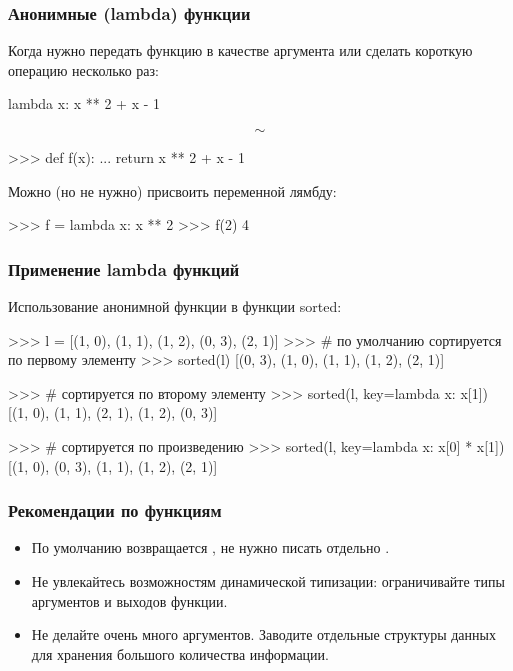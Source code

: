 \documentclass[fleqn, xcolor=x11names, 11pt]{beamer}
\begin{document}
\begin{frame}[fragile]\frametitle{Анонимные (lambda) функции}
Когда нужно передать функцию в качестве аргумента или сделать короткую операцию несколько раз:

\hfill

\begin{pcode}
lambda x: x ** 2 + x - 1
\end{pcode}
{\Large $$ \sim $$}
\begin{pcode}
>>> def f(x):
...     return x ** 2 + x - 1
\end{pcode} 

\hfill

Можно (но не нужно) присвоить переменной лямбду:
\begin{pcode}
>>>    f = lambda x: x ** 2
>>>    f(2)
4
\end{pcode}
\end{frame}

\begin{frame}[fragile]\frametitle{Применение lambda функций}
Использование анонимной функции в функции sorted:

\begin{pcode}
>>> l = [(1, 0), (1, 1), (1, 2), (0, 3), (2, 1)]
>>> # по умолчанию сортируется по первому элементу
>>> sorted(l)
[(0, 3), (1, 0), (1, 1), (1, 2), (2, 1)]

>>> # сортируется по второму элементу
>>> sorted(l, key=lambda x: x[1])
[(1, 0), (1, 1), (2, 1), (1, 2), (0, 3)]

>>> # сортируется по произведению
>>> sorted(l, key=lambda x: x[0] * x[1])
[(1, 0), (0, 3), (1, 1), (1, 2), (2, 1)]
\end{pcode}
\end{frame}

\begin{frame}[fragile]\frametitle{Рекомендации по функциям}
\begin{itemize}
	\item По умолчанию возвращается , не нужно писать отдельно .
	\item Не увлекайтесь возможностям динамической типизации: ограничивайте типы аргументов и выходов функции.
	\item Не делайте очень много аргументов. Заводите отдельные структуры данных для хранения большого количества информации.
\end{itemize}
	
\end{frame}
\end{document}
